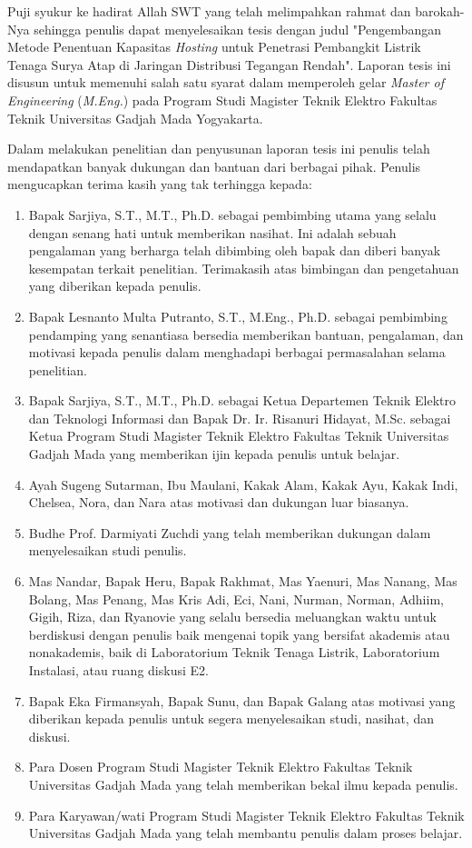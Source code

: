 Puji syukur ke hadirat Allah SWT yang telah melimpahkan rahmat dan barokah-Nya sehingga penulis dapat menyelesaikan tesis dengan judul "Pengembangan Metode Penentuan Kapasitas \textit{Hosting} untuk Penetrasi Pembangkit Listrik Tenaga Surya Atap di Jaringan Distribusi Tegangan Rendah". Laporan tesis ini disusun untuk memenuhi salah satu syarat dalam memperoleh gelar \textit{Master of Engineering} (\textit{M.Eng.}) pada Program Studi Magister Teknik Elektro Fakultas Teknik Universitas Gadjah Mada Yogyakarta.

Dalam melakukan penelitian dan penyusunan laporan tesis ini penulis telah mendapatkan banyak dukungan dan bantuan dari berbagai pihak. Penulis mengucapkan terima kasih yang tak terhingga kepada:

\begin{enumerate}
	\item Bapak Sarjiya, S.T., M.T., Ph.D. sebagai pembimbing utama yang selalu dengan senang hati untuk memberikan nasihat. Ini adalah sebuah pengalaman yang berharga telah dibimbing oleh bapak dan diberi banyak kesempatan terkait penelitian. Terimakasih atas bimbingan dan pengetahuan yang diberikan kepada penulis.
	\item Bapak Lesnanto Multa Putranto, S.T., M.Eng., Ph.D. sebagai pembimbing pendamping yang senantiasa bersedia memberikan bantuan, pengalaman, dan motivasi kepada penulis dalam menghadapi berbagai permasalahan selama penelitian.
	\item Bapak Sarjiya, S.T., M.T., Ph.D. sebagai Ketua Departemen Teknik Elektro dan Teknologi Informasi dan Bapak Dr. Ir. Risanuri Hidayat, M.Sc.  sebagai Ketua Program Studi Magister Teknik Elektro Fakultas Teknik Universitas Gadjah Mada yang memberikan ijin kepada penulis untuk belajar.
	\item Ayah Sugeng Sutarman, Ibu Maulani, Kakak Alam, Kakak Ayu, Kakak Indi, Chelsea, Nora, dan Nara atas motivasi dan dukungan luar biasanya.
	\item Budhe Prof. Darmiyati Zuchdi yang telah memberikan dukungan dalam menyelesaikan studi penulis.
	\item Mas Nandar, Bapak Heru, Bapak Rakhmat, Mas Yaenuri, Mas Nanang, Mas Bolang, Mas Penang, Mas Kris Adi, Eci, Nani, Nurman, Norman, Adhiim, Gigih, Riza, dan Ryanovie yang selalu bersedia meluangkan waktu untuk berdiskusi dengan penulis baik mengenai topik yang bersifat akademis atau nonakademis, baik di Laboratorium Teknik Tenaga Listrik, Laboratorium Instalasi, atau ruang diskusi E2.
	\item Bapak Eka Firmansyah, Bapak Sunu, dan Bapak Galang atas motivasi yang diberikan kepada penulis untuk segera menyelesaikan studi, nasihat, dan diskusi.
	\item Para Dosen Program Studi Magister Teknik Elektro Fakultas Teknik Universitas Gadjah Mada yang telah memberikan bekal ilmu kepada penulis.
	\item Para Karyawan/wati Program Studi Magister Teknik Elektro Fakultas Teknik Universitas Gadjah Mada yang telah membantu penulis dalam proses belajar.
\end{enumerate}

